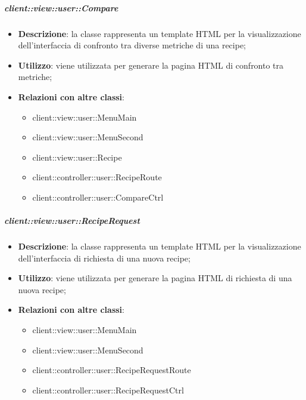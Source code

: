 		\subparagraph{client::view::user::Compare} %
		\label{subp:bdsm_app_client_view_user_compare}
			\begin{itemize}
				\item \textbf{Descrizione}: la classe rappresenta un template HTML per la visualizzazione dell'interfaccia di confronto tra diverse metriche di una recipe;
				\item \textbf{Utilizzo}: viene utilizzata per generare la pagina HTML di confronto tra metriche;
				\item \textbf{Relazioni con altre classi}:
					\begin{itemize}
						\item client::view::user::MenuMain
						\item client::view::user::MenuSecond
						\item client::view::user::Recipe
						\item client::controller::user::RecipeRoute
						\item client::controller::user::CompareCtrl
					\end{itemize}
			\end{itemize}

		\subparagraph{client::view::user::RecipeRequest} %
		\label{subp:bdsm_app_client_view_user_reciperequest}
			\begin{itemize}
				\item \textbf{Descrizione}: la classe rappresenta un template HTML per la visualizzazione dell'interfaccia di richiesta di una nuova recipe;
				\item \textbf{Utilizzo}: viene utilizzata per generare la pagina HTML di richiesta di una nuova recipe;
				\item \textbf{Relazioni con altre classi}:
					\begin{itemize}
						\item client::view::user::MenuMain
						\item client::view::user::MenuSecond
						\item client::controller::user::RecipeRequestRoute
						\item client::controller::user::RecipeRequestCtrl
					\end{itemize}
			\end{itemize}

